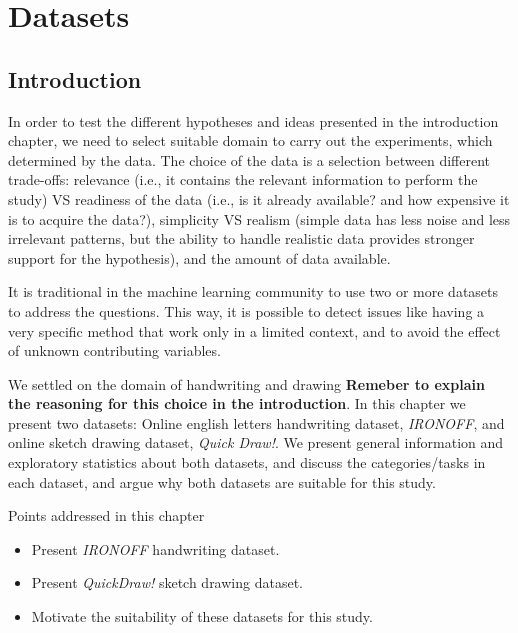 \chapter{Datasets}
\minitoc%

\section{Introduction}
\par In order to test the different hypotheses and ideas presented in the introduction chapter, we need to select suitable domain to carry out the experiments, which determined by the data. The choice of the data is a selection between different trade-offs: relevance (i.e., it contains the relevant information to perform the study) VS readiness of the data (i.e., is it already available? and how expensive it is to acquire the data?), simplicity VS realism (simple data has less noise and less irrelevant patterns, but the ability to handle realistic data provides stronger support for the hypothesis), and the amount of data available.

\par It is traditional in the machine learning community to use two or more datasets to address the questions. This way, it is possible to detect issues like having a very specific method that work only in a limited context, and to avoid the effect of unknown contributing variables.

\par We settled on the domain of handwriting and drawing \textbf{Remeber to explain the reasoning for this choice in the introduction}. In this chapter we present two datasets: Online english letters handwriting dataset, \textit{IRONOFF}, and online sketch drawing dataset, \textit{Quick Draw!}. We present general information and exploratory statistics about both datasets, and discuss the categories/tasks in each dataset, and argue why both datasets are suitable for this study.

\begin{mdframed}[backgroundcolor=blue!20]
    \begin{center}
        Points addressed in this chapter
    \end{center}

    \begin{itemize}[noitemsep]
        \item Present \textit{IRONOFF} handwriting dataset.
        \item Present \textit{QuickDraw!} sketch drawing dataset.
        \item Motivate the suitability of these datasets for this study.
    \end{itemize}
\end{mdframed}

